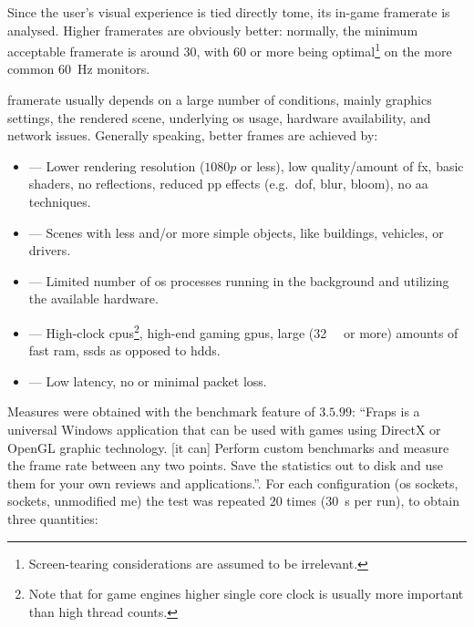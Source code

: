 

Since the user's visual experience is tied directly to\gls{me}, its in-game \gls{framerate} is analysed. Higher \glspl{framerate} are obviously better: normally, the minimum acceptable \gls{framerate} is around \SI{30}{\fps}, with \SI{60}{\fps} or more being optimal\footnote{Screen-tearing considerations are assumed to be irrelevant.} on the more common \SI{60}{\hertz} monitors.

\Gls{framerate} usually depends on a large number of conditions, mainly graphics settings, the rendered scene, underlying \gls{os} usage, hardware availability, and network issues. Generally speaking, better frames are achieved by:

\begin{itemize}
	\item {} --- Lower rendering resolution ($1080p$ or less), low quality/amount of \gls{fx}, basic shaders, no reflections, reduced \gls{pp} effects (e.g.\ \gls{dof}, blur, bloom), no \gls{aa} techniques.
	\item {} --- Scenes with less and/or more simple objects, like buildings, vehicles, or drivers.
	\item {} --- Limited number of \gls{os} processes running in the background and utilizing the available hardware.
	\item {} --- High-clock \glspl{cpu}\footnote{Note that for game engines higher single core clock is usually more important than high thread counts.}, high-end gaming \glspl{gpu}, large (\SI{32}{\giga\byte} or more) amounts of fast \gls{ram}, \glspl{ssd} as opposed to \glspl{hdd}.
	\item {} --- Low latency, no or minimal packet loss.
\end{itemize}

Measures were obtained with the benchmark feature of  $3.5.99$: \enquote{Fraps is a universal Windows application that can be used with games using DirectX or OpenGL graphic technology. [it can] Perform custom benchmarks and measure the frame rate between any two points.  Save the statistics out to disk and use them for your own reviews and applications.}{\cite{performance:fraps}}. For each configuration (\gls{os} sockets,  sockets, unmodified \gls{me}) the test was repeated \num{20} times (\SI{30}{\second} per run), to obtain three quantities:

